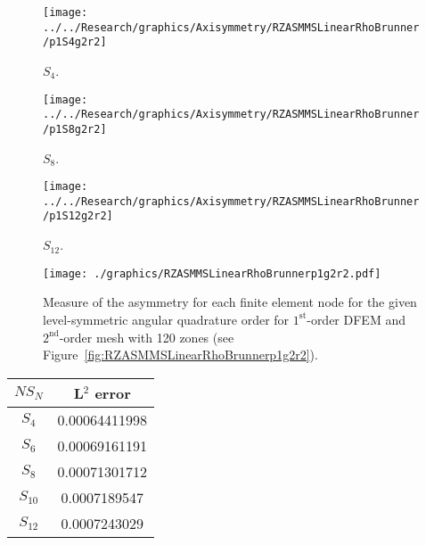 \documentclass[12pt]{article}
\begin{document}
\begin{sidewaysfigure}[!htb]
\centering
\begin{subfigure}{0.33\textwidth}
\texttt{[image: ../../Research/graphics/Axisymmetry/RZASMMSLinearRhoBrunner/p1S4g2r2]}
\caption{$S_4$.}
\end{subfigure}%
\begin{subfigure}{0.33\textwidth}
\texttt{[image: ../../Research/graphics/Axisymmetry/RZASMMSLinearRhoBrunner/p1S8g2r2]}
\caption{$S_8$.}
\end{subfigure}%
\begin{subfigure}{0.33\textwidth}
\texttt{[image: ../../Research/graphics/Axisymmetry/RZASMMSLinearRhoBrunner/p1S12g2r2]}
\caption{$S_{12}$.}
\end{subfigure}
\caption{Relative asymmetry for $1^\text{st}$-order finite elements on a $2^\text{nd}$-order mesh for given order of level-symmetric angular quadrature.}
\label{fig:RZASMMSLinearRhoBrunnerp1g2r2}
\end{sidewaysfigure}

\begin{figure}[!htb]
\centering
\texttt{[image: ./graphics/RZASMMSLinearRhoBrunnerp1g2r2.pdf]}
\caption{Measure of the asymmetry for each finite element node for the given level-symmetric angular quadrature order for $1^\text{st}$-order DFEM and $2^\text{nd}$-order mesh with 120 zones (see Figure~\ref{fig:RZASMMSLinearRhoBrunnerp1g2r2}).}
\label{fig:RZASMMSLinearRhoBrunnerp1g2r2Nodes}
\end{figure}

\begin{table}[!htb]
\centering
{\renewcommand{\arraystretch}{1.5}
\begin{tabular}{|c|c|}
\hline
$NS_N$ & L$^2$ error \\\hline
$S_4$ & 0.00064411998 \\\hline
$S_6$ & 0.00069161191 \\\hline
$S_8$ & 0.00071301712 \\\hline
$S_{10}$ & 0.0007189547 \\\hline
$S_{12}$ & 0.0007243029 \\\hline
\end{tabular}}
\end{table}
\end{document}
